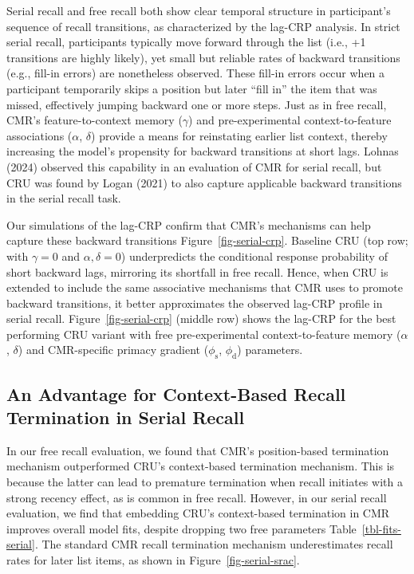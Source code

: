 \documentclass[
  letterpaper,
  11pt,
  english,
  singlespacing,
  headsepline]{MastersDoctoralThesis}
\begin{document}
Serial recall and free recall both show clear temporal structure in
participant's sequence of recall transitions, as characterized by the
lag-CRP analysis. In strict serial recall, participants typically move
forward through the list (i.e., +1 transitions are highly likely), yet
small but reliable rates of backward transitions (e.g., fill-in errors)
are nonetheless observed. These fill-in errors occur when a participant
temporarily skips a position but later ``fill in'' the item that was
missed, effectively jumping backward one or more steps. Just as in free
recall, CMR's feature-to-context memory (\(\gamma\)) and
pre-experimental context-to-feature associations (\(\alpha\),
\(\delta\)) provide a means for reinstating earlier list context,
thereby increasing the model's propensity for backward transitions at
short lags. Lohnas (2024) observed this capability in an evaluation of
CMR for serial recall, but CRU was found by Logan (2021) to also capture
applicable backward transitions in the serial recall task.

Our simulations of the lag-CRP confirm that CMR's mechanisms can help
capture these backward transitions Figure~\ref{fig-serial-crp}. Baseline
CRU (top row; with \(\gamma=0\) and \(\alpha, \delta=0\)) underpredicts
the conditional response probability of short backward lags, mirroring
its shortfall in free recall. Hence, when CRU is extended to include the
same associative mechanisms that CMR uses to promote backward
transitions, it better approximates the observed lag-CRP profile in
serial recall. Figure~\ref{fig-serial-crp} (middle row) shows the
lag-CRP for the best performing CRU variant with free pre-experimental
context-to-feature memory (\(\alpha\), \(\delta\)) and CMR-specific
primacy gradient (\(\phi_\text{s}\), \(\phi_\text{d}\)) parameters.

\subsection{An Advantage for Context-Based Recall Termination in Serial
Recall}\label{an-advantage-for-context-based-recall-termination-in-serial-recall}

In our free recall evaluation, we found that CMR's position-based
termination mechanism outperformed CRU's context-based termination
mechanism. This is because the latter can lead to premature termination
when recall initiates with a strong recency effect, as is common in free
recall. However, in our serial recall evaluation, we find that embedding
CRU's context-based termination in CMR improves overall model fits,
despite dropping two free parameters Table~\ref{tbl-fits-serial}. The
standard CMR recall termination mechanism underestimates recall rates
for later list items, as shown in Figure~\ref{fig-serial-srac}.
\end{document}
